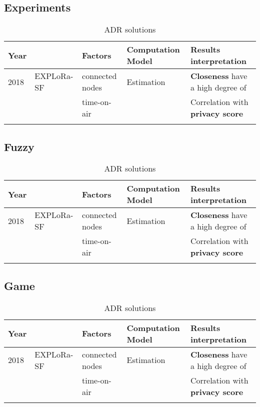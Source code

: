 \subsection{Experiments}
\begin{longtable}{lllll}
	Year  & \                                              & \textbf{Factors}           & \textbf{Computation Model}             & \textbf{Results interpretation}                               \\\hline
	2018  & EXPLoRa-SF \cite{cuomo_explora_2017}           & connected nodes            & Estimation                             & \textbf{Closeness} have a high degree of                      \\
	\     &                                                & time-on-air                &                                        & Correlation with \textbf{privacy score}                       \\\hline

\caption{ADR solutions}
\end{longtable}


\subsection{Fuzzy}
\begin{longtable}{lllll}
	Year  & \                                              & \textbf{Factors}           & \textbf{Computation Model}             & \textbf{Results interpretation}                               \\\hline
	2018  & EXPLoRa-SF \cite{cuomo_explora_2017}           & connected nodes            & Estimation                             & \textbf{Closeness} have a high degree of                      \\
	\     &                                                & time-on-air                &                                        & Correlation with \textbf{privacy score}                       \\\hline

\caption{ADR solutions}
\end{longtable}


\subsection{Game}
\begin{longtable}{lllll}
	Year  & \                                              & \textbf{Factors}           & \textbf{Computation Model}             & \textbf{Results interpretation}                               \\\hline
	2018  & EXPLoRa-SF \cite{cuomo_explora_2017}           & connected nodes            & Estimation                             & \textbf{Closeness} have a high degree of                      \\
	\     &                                                & time-on-air                &                                        & Correlation with \textbf{privacy score}                       \\\hline

\caption{ADR solutions}
\end{longtable}



